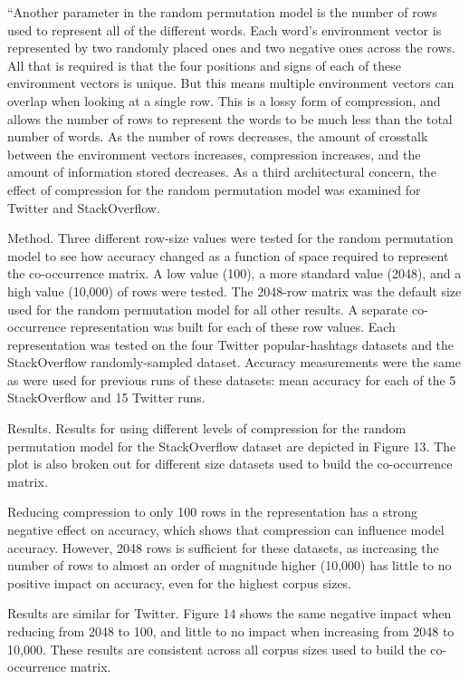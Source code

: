\documentclass[answers,12pt]{exam}
\begin{document}
\begin{questions}
\begin{solution}
``Another parameter in the random permutation model is the number of rows used to represent all of the different words. Each word’s environment vector is represented by two randomly placed ones and two negative ones across the rows. All that is required is that the four positions and signs of each of these environment vectors is unique. But this means multiple environment vectors can overlap when looking at a single row. This is a lossy form of compression, and allows the number of rows to represent the words to be much less than the total number of words. As the number of rows decreases, the amount of crosstalk between the environment vectors increases, compression increases, and the amount of information stored decreases. As a third architectural concern, the effect of compression for the random permutation model was examined for Twitter and StackOverflow.

Method. Three different row-size values were tested for the random permutation model to see how accuracy changed as a function of space required to represent the co-occurrence matrix. A low value (100), a more standard value (2048), and a high value (10,000) of rows were tested. The 2048-row matrix was the default size used for the random permutation model for all other results. A separate co-occurrence representation was built for each of these row values. Each representation was tested on the four Twitter popular-hashtags datasets and the StackOverflow randomly-sampled dataset. Accuracy measurements were the same as were used for previous runs of these datasets: mean accuracy for each of the 5 StackOverflow and 15 Twitter runs.

Results. Results for using different levels of compression for the random permutation model for the StackOverflow dataset are depicted in Figure 13. The plot is also broken out for different size datasets used to build the co-occurrence matrix.

Reducing compression to only 100 rows in the representation has a strong negative effect on accuracy, which shows that compression can influence model accuracy. However, 2048 rows is sufficient for these datasets, as increasing the number of rows to almost an order of magnitude higher (10,000) has little to no positive impact on accuracy, even for the highest corpus sizes.

Results are similar for Twitter. Figure 14 shows the same negative impact when reducing from 2048 to 100, and little to no impact when increasing from 2048 to 10,000. These results are consistent across all corpus sizes used to build the co-occurrence matrix.


\end{solution}
\end{questions}
\end{document}
